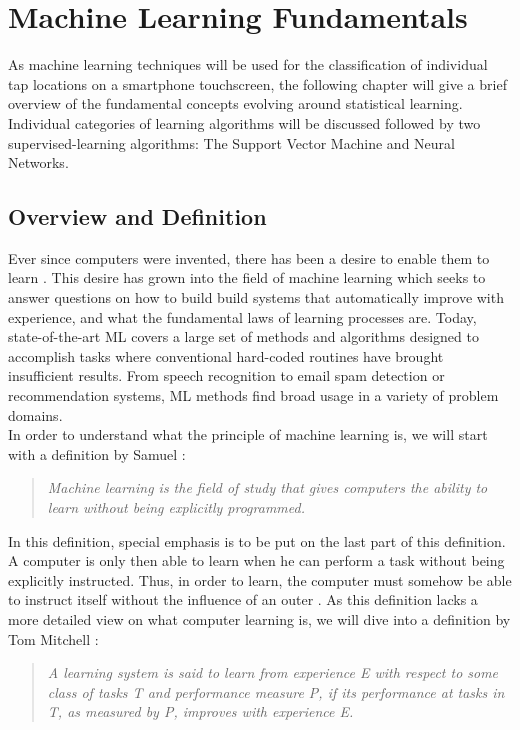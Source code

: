 \chapter{Machine Learning Fundamentals}
As machine learning techniques will be used for the classification of individual tap locations on a smartphone touchscreen, the following chapter will give a brief overview of the fundamental concepts evolving around statistical learning. Individual categories of learning algorithms will be discussed followed by two supervised-learning algorithms: The Support Vector Machine and Neural Networks.

\section{Overview and Definition}

Ever since computers were invented, there has been a desire to enable them to learn \cite{samuel2000some}. This desire has grown into the field of machine learning which seeks to answer questions on how to build build systems that automatically improve with experience, and what the fundamental laws of learning processes are. Today, state-of-the-art ML covers a large set of methods and algorithms designed to accomplish tasks where conventional hard-coded routines have brought insufficient results. From speech recognition to email spam detection or recommendation systems, ML methods find broad usage in a variety of problem domains. \\

In order to understand what the principle of machine learning is, we will start with a definition by Samuel \cite{samuel2000some}:\\
\begin{quote}
\textit{Machine learning is the field of study that gives computers the ability to learn without being explicitly programmed.}\\
\end{quote}

In this definition, special emphasis is to be put on the last part of this definition. A computer is only then able to learn when he can perform a task without being explicitly instructed. Thus, in order to learn, the computer must somehow be able to instruct itself without the influence of an outer . As this definition lacks a more detailed view on what computer learning is, we will dive into a definition by Tom Mitchell \cite{mitchell2006discipline}:\\
\begin{quote}
\textit{A learning system is said to learn from experience E with respect to some class of tasks T and performance measure P, if its performance at tasks in T, as measured by P, improves with experience E.}\\
\end{quote}

